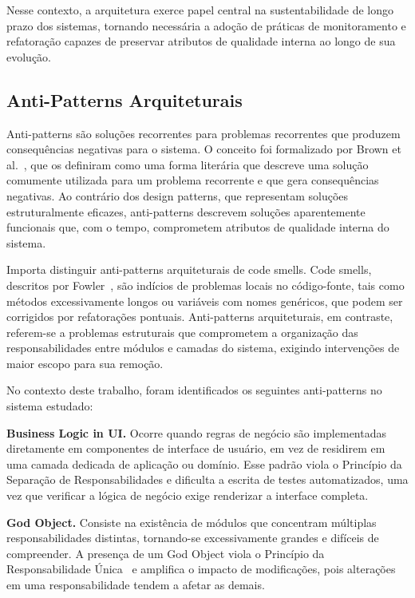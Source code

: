 \documentclass[sigconf,anonymous]{acmart}
\begin{document}
Nesse contexto, a arquitetura exerce papel central na sustentabilidade de longo prazo dos sistemas, tornando necessária a adoção de práticas de monitoramento e refatoração capazes de preservar atributos de qualidade interna ao longo de sua evolução.


\subsection{Anti-Patterns Arquiteturais}

Anti-patterns são soluções recorrentes para problemas recorrentes que produzem consequências negativas para o sistema. O conceito foi formalizado por Brown et al.~\cite{Brown1998}, que os definiram como uma forma literária que descreve uma solução comumente utilizada para um problema recorrente e que gera consequências negativas. Ao contrário dos design patterns, que representam soluções estruturalmente eficazes, anti-patterns descrevem soluções aparentemente funcionais que, com o tempo, comprometem atributos de qualidade interna do sistema.

Importa distinguir anti-patterns arquiteturais de code smells. Code smells, descritos por Fowler~\cite{Fowler2018}, são indícios de problemas locais no código-fonte, tais como métodos excessivamente longos ou variáveis com nomes genéricos, que podem ser corrigidos por refatorações pontuais. Anti-patterns arquiteturais, em contraste, referem-se a problemas estruturais que comprometem a organização das responsabilidades entre módulos e camadas do sistema, exigindo intervenções de maior escopo para sua remoção.

No contexto deste trabalho, foram identificados os seguintes anti-patterns no sistema estudado:

\textbf{Business Logic in UI.} Ocorre quando regras de negócio são implementadas diretamente em componentes de interface de usuário, em vez de residirem em uma camada dedicada de aplicação ou domínio. Esse padrão viola o Princípio da Separação de Responsabilidades e dificulta a escrita de testes automatizados, uma vez que verificar a lógica de negócio exige renderizar a interface completa.

\textbf{God Object.} Consiste na existência de módulos que concentram múltiplas responsabilidades distintas, tornando-se excessivamente grandes e difíceis de compreender. A presença de um God Object viola o Princípio da Responsabilidade Única~\cite{Martin2017} e amplifica o impacto de modificações, pois alterações em uma responsabilidade tendem a afetar as demais.
\end{document}
